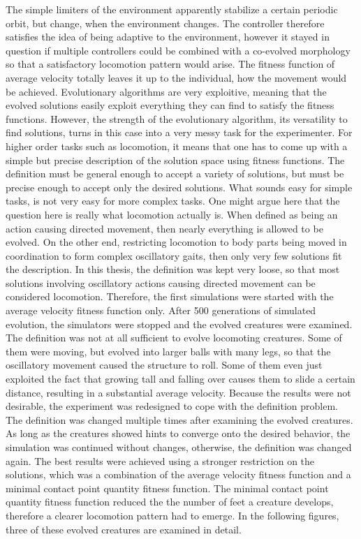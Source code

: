 \documentclass[main]{subfiles}
\begin{document}
The simple limiters of the environment apparently stabilize a certain periodic orbit, but change, when the environment changes. %
%
The controller therefore satisfies the idea of being adaptive to the environment, however it stayed in question if multiple controllers could be combined with a co-evolved morphology so that a satisfactory locomotion pattern would arise. %
%
The fitness function of average velocity totally leaves it up to the individual, how the movement would be achieved. %
%
Evolutionary algorithms are very exploitive, meaning that the evolved solutions easily exploit everything they can find to satisfy the fitness functions. %
%
However, the strength of the evolutionary algorithm, its versatility to find solutions, turns in this case into a very messy task for the experimenter. %
%
For higher order tasks such as locomotion, it means that one has to come up with a simple but precise description of the solution space using fitness functions. %
%
The definition must be general enough to accept a variety of solutions, but must be precise enough to accept only the desired solutions. %
%
What sounds easy for simple tasks, is not very easy for more complex tasks. %
%
One might argue here that the question here is really what locomotion actually is. %
%
When defined as being an action causing directed movement, then nearly everything is allowed to be evolved. %
%
On the other end, restricting locomotion to body parts being moved in coordination to form complex oscillatory gaits, then only very few solutions fit the description. %
%
In this thesis, the definition was kept very loose, so that most solutions involving oscillatory actions causing directed movement can be considered locomotion. %
%
Therefore, the first simulations were started with the average velocity fitness function only. %
%
After 500 generations of simulated evolution, the simulators were stopped and the evolved creatures were examined. %
%
The definition was not at all sufficient to evolve locomoting creatures. %
%
Some of them were moving, but evolved into larger balls with many legs, so that the oscillatory movement caused the structure to roll. %
%
Some of them even just exploited the fact that growing tall and falling over causes them to slide a certain distance, resulting in a substantial average velocity. %
%
Because the results were not desirable, the experiment was redesigned to cope with the definition problem. %
%
The definition was changed multiple times after examining the evolved creatures. %
%
As long as the creatures showed hints to converge onto the desired behavior, the simulation was continued without changes, otherwise, the definition was changed again. %
%
The best results were achieved using a stronger restriction on the solutions, which was a combination of the average velocity fitness function and a minimal contact point quantity fitness function. %
%
The minimal contact point quantity fitness function reduced the the number of feet a creature develops, therefore a clearer locomotion pattern had to emerge. %
%
In the following figures, three of these evolved creatures are examined in detail.
\end{document}
